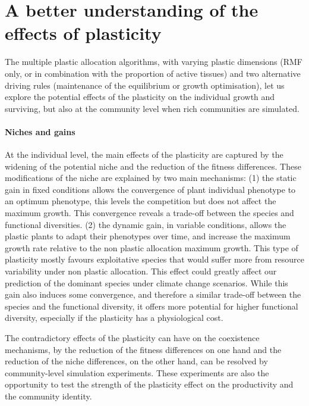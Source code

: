 \section{A better understanding of the effects of plasticity}

The multiple plastic allocation algorithms, with varying plastic dimensions (RMF only, or in combination with the proportion of active tissues) and two alternative driving rules (maintenance of the equilibrium or growth optimisation), let us explore the potential effects of the plasticity on the individual growth and surviving, but also at the community level when rich communities are simulated.

\paragraph{Niches and gains}

At the individual level, the main effects of the plasticity are captured by the widening of the potential niche and the reduction of the fitness differences. These modifications of the niche are explained by two main mechanisms: (1) the static gain in fixed conditions allows the convergence of plant individual phenotype to an optimum phenotype, this levels the competition but does not affect the maximum growth. This convergence reveals a trade-off between the species and functional diversities. (2) the dynamic gain, in variable conditions, allows the plastic plants to adapt their phenotypes over time, and increase the maximum growth rate relative to the non plastic allocation maximum growth. This type of plasticity mostly favours exploitative species that would suffer more from resource variability under non plastic allocation. This effect could greatly affect our prediction of the dominant species under climate change scenarios. While this gain also induces some convergence, and therefore a similar trade-off between the species and the functional diversity, it offers more potential for higher functional diversity, especially if the plasticity has a physiological cost.

The contradictory effects of the plasticity can have on the coexistence mechanisms, by the reduction of the fitness differences on one hand and the reduction of the niche differences, on the other hand, can be resolved by community-level simulation experiments. These experiments are also the opportunity to test the strength of the plasticity effect on the productivity and the community identity.

